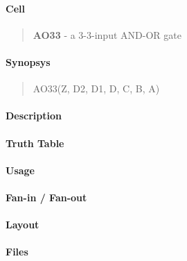 \label{AO33}
\paragraph{Cell}
\begin{quote}
    \textbf{AO33} - a 3-3-input AND-OR gate
\end{quote}

\paragraph{Synopsys}
\begin{quote}
    AO33(Z, D2, D1, D, C, B, A)
\end{quote}

\paragraph{Description}

%

\paragraph{Truth Table}


\paragraph{Usage}

\paragraph{Fan-in / Fan-out}

\paragraph{Layout}

\paragraph{Files}
